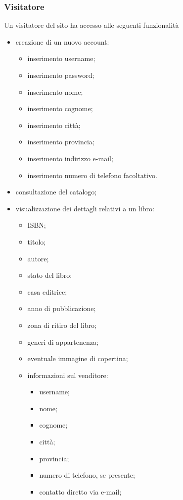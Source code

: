 \documentclass[openany,10pt,a4paper]{article}
\begin{document}
		\subsubsection{Visitatore}
		Un visitatore del sito ha accesso alle seguenti funzionalità
				\begin{itemize}
					\item creazione di un nuovo account:
						\begin{itemize}
							\item inserimento username;
							\item inserimento password;
							\item inserimento nome;
							\item inserimento cognome;
							\item inserimento città;
							\item inserimento provincia;
							\item inserimento indirizzo e-mail;
							\item inserimento numero di telefono facoltativo.
						\end{itemize}
					\item consultazione del catalogo;
					\item visualizzazione dei dettagli relativi a un libro:
						\begin{itemize}
							\item ISBN;
							\item titolo;
							\item autore;
							\item stato del libro;
							\item casa editrice;
							\item anno di pubblicazione;
							\item zona di ritiro del libro;
							\item generi di appartenenza;
							\item eventuale immagine di copertina;
							\item informazioni sul venditore:
								\begin{itemize}
									\item username;
									\item nome;
									\item cognome;
									\item città;
									\item provincia;
									\item numero di telefono, se presente;
									\item contatto diretto via e-mail;
								\end{itemize}
							
						\end{itemize}
				\end{itemize}		
\end{document}
